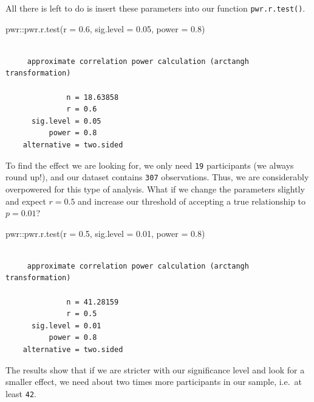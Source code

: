 \documentclass[
  letterpaper,
  DIV=11,
  numbers=noendperiod]{scrreprt}
\newenvironment{Shaded}{\begin{snugshade}}{\end{snugshade}}
\newcommand{\AttributeTok}[1]{\textcolor[rgb]{0.40,0.45,0.13}{#1}}
\newcommand{\FloatTok}[1]{\textcolor[rgb]{0.68,0.00,0.00}{#1}}
\newcommand{\FunctionTok}[1]{\textcolor[rgb]{0.28,0.35,0.67}{#1}}
\newcommand{\NormalTok}[1]{\textcolor[rgb]{0.00,0.23,0.31}{#1}}
\newcommand{\SpecialCharTok}[1]{\textcolor[rgb]{0.37,0.37,0.37}{#1}}
\begin{document}
All there is left to do is insert these parameters into our function
\texttt{pwr.r.test()}.

\begin{Shaded}
\begin{Highlighting}[]
\NormalTok{pwr}\SpecialCharTok{::}\FunctionTok{pwr.r.test}\NormalTok{(}\AttributeTok{r =} \FloatTok{0.6}\NormalTok{,}
                \AttributeTok{sig.level =} \FloatTok{0.05}\NormalTok{,}
                \AttributeTok{power =} \FloatTok{0.8}\NormalTok{)}
\end{Highlighting}
\end{Shaded}

\begin{verbatim}

     approximate correlation power calculation (arctangh transformation) 

              n = 18.63858
              r = 0.6
      sig.level = 0.05
          power = 0.8
    alternative = two.sided
\end{verbatim}

To find the effect we are looking for, we only need \texttt{19}
participants (we always round up!), and our dataset contains
\texttt{307} observations. Thus, we are considerably overpowered for
this type of analysis. What if we change the parameters slightly and
expect \(r = 0.5\) and increase our threshold of accepting a true
relationship to \(p = 0.01\)?

\begin{Shaded}
\begin{Highlighting}[]
\NormalTok{pwr}\SpecialCharTok{::}\FunctionTok{pwr.r.test}\NormalTok{(}\AttributeTok{r =} \FloatTok{0.5}\NormalTok{,}
                \AttributeTok{sig.level =} \FloatTok{0.01}\NormalTok{,}
                \AttributeTok{power =} \FloatTok{0.8}\NormalTok{)}
\end{Highlighting}
\end{Shaded}

\begin{verbatim}

     approximate correlation power calculation (arctangh transformation) 

              n = 41.28159
              r = 0.5
      sig.level = 0.01
          power = 0.8
    alternative = two.sided
\end{verbatim}

The results show that if we are stricter with our significance level and
look for a smaller effect, we need about two times more participants in
our sample, i.e.~at least \texttt{42}.
\end{document}
